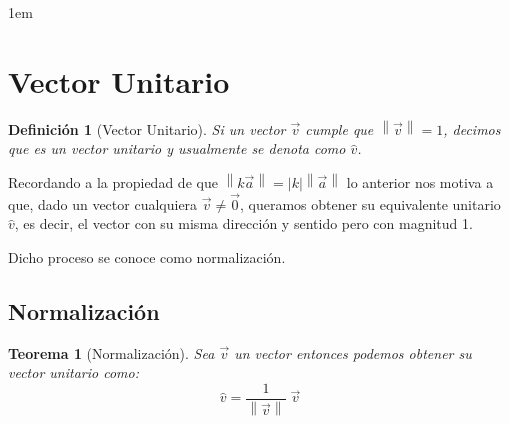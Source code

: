 \documentclass[12pt, fleqn]{report}                             %
\newenvironment{SmallIndentation}[1][0.75em]                    %
    {\begin{adjustwidth}{#1}{}\begin{footnotesize}}                 %
    {\end{footnotesize}\end{adjustwidth}}                           %
\newcommand{\abs}[1]{\left\lvert #1 \right\lvert}               %
\newcommand{\Abs}[1]{\left\lVert #1 \right\lVert}               %
\newtheorem{Theorem}{Teorema}[section]                          %
\newtheorem{Definition}{Definición}[section]                    %
\begin{document}
\begin{itemize}
\begin{SmallIndentation}[1em]
                        \end{SmallIndentation}

                \end{itemize}




        \clearpage
        \section{Vector Unitario}

            \begin{Definition}[Vector Unitario]
                Si un vector $\vec{v}$ cumple que $\Abs{\vec{v}} = 1$, decimos que es un
                \emph{vector unitario} y usualmente se denota como $\hat{v}$.
            \end{Definition}

            Recordando a la propiedad de que $\Abs{k\vec{a}} = \abs{k} \Abs{\vec{a}}$ lo anterior
            nos motiva a que, dado un vector cualquiera $\vec{v} \neq \vec{0}$, queramos obtener
            su equivalente unitario $\hat{v}$, es decir, el vector con su misma dirección y sentido
            pero con magnitud 1.

            Dicho proceso se conoce como normalización.

            \subsection{Normalización}
                
                \begin{Theorem}[Normalización]
                    Sea $\vec{v}$ un vector entonces podemos obtener su vector unitario como:
                    \begin{equation}
                        \hat{v} = \dfrac{1}{ \Abs{\vec{v}}} \; \vec{v}
                    \end{equation}
                \end{Theorem}
            
\end{document}
